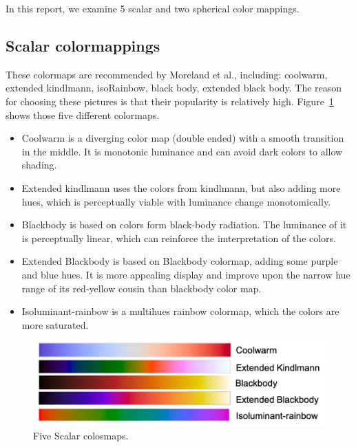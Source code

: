\documentclass[hyperref, plainreport, noproblem]{cgvpub1}
\begin{document}
In this report, we examine 5 scalar and two spherical color mappings. 

\subsection*{Scalar colormappings}

These colormaps are recommended by Moreland et al., including: coolwarm, extended kindlmann, isoRainbow, black body, extended black body. The reason for choosing these pictures is that their popularity is relatively high. Figure~\ref{fig:1} shows those five different colormaps.

\begin{itemize}
	\item Coolwarm is a diverging color map (double ended) with a smooth transition in the middle. It is monotonic luminance and can avoid dark colors to allow shading. 

	\item Extended kindlmann uses the colors from kindlmann, but also adding more hues, which is perceptually viable with luminance change monotomically. 

	\item Blackbody is based on colors form black-body radiation. The luminance of it is perceptually linear, which can reinforce the imterpretation of the colors.

	\item Extended Blackbody is based on Blackbody colormap, adding some purple and blue hues. It is more appealing display and improve upon the narrow hue range of its red-yellow cousin than blackbody color map. 

	\item Isoluminant-rainbow is a multihues rainbow colormap, which the colors are more saturated.
\end{itemize}
\begin{figure}[ht]
    \centering
    \includegraphics[width = 0.8\columnwidth]{1}
    \caption{ Five Scalar colosmaps.}
    \label{fig:1}
\end{figure}	
\end{document}
